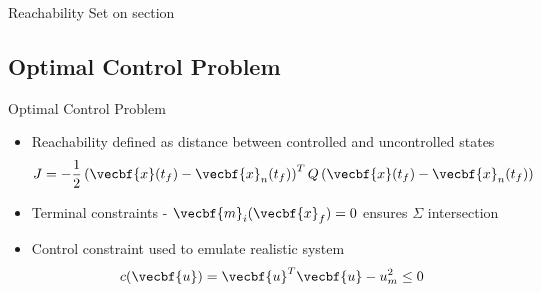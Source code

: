 \begin{frame}{Reachability Set on \Poincare section}
\begin{center}
\end{center}

\end{frame} %

\subsection[Formulating the optimal control problem]{Optimal Control Problem}

\begin{frame}{Optimal Control Problem}
\begin{itemize}
    \item Reachability defined as distance between controlled and uncontrolled states
        \[
            J = -\frac{1}{2} \left( \vecbf{x}(t_f) - \vecbf{x}_{n}(t_f)\right)^T 
            Q
            \left( \vecbf{x}(t_f) - \vecbf{x}_{n}(t_f)\right) 
        \]
    
    \pause
    \item Terminal constraints - \( \vecbf{m}_i(\vecbf{x}_f) = 0\) ensures \( \Sigma \) intersection
    \pause
    \item Control constraint used to emulate realistic system
        \[
            c(\vecbf{u}) = \vecbf{u}^T \vecbf{u} - u_m^2 \leq 0 
        \]
\end{itemize}

\end{frame}

